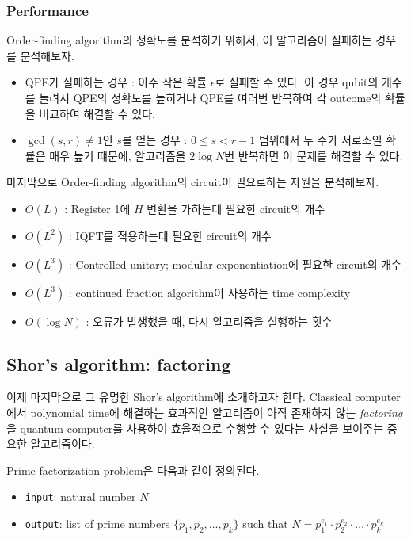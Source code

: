 \subsubsection{Performance}
Order-finding algorithm의 정확도를 분석하기 위해서, 이 알고리즘이 실패하는 경우를 분석해보자.
\begin{itemize}
  \item QPE가 실패하는 경우 : 아주 작은 확률 $\epsilon$로 실패할 수 있다. 이 경우 qubit의 개수를 늘려서 QPE의 정확도를 높히거나 QPE를 여러번 반복하여 각 outcome의 확률을 비교하여 해결할 수 있다.
  \item $\gcd(s,r) \ne 1$인 $s$를 얻는 경우 : $0 \le s <r-1$ 범위에서 두 수가 서로소일 확률은 매우 높기 떄문에, 알고리즘을 $2 \log N$번 반복하면 이 문제를 해결할 수 있다.
\end{itemize}
\vspace{1em}
마지막으로 Order-finding algorithm의 circuit이 필요로하는 자원을 분석해보자.
\begin{itemize}
  \item $O(L)$ : Register 1에 $H$ 변환을 가하는데 필요한 circuit의 개수
  \item $O(L^2)$ : IQFT를 적용하는데 필요한 circuit의 개수
  \item $O(L^3)$ : Controlled unitary; modular exponentiation에 필요한 circuit의 개수
  \item $O(L^3)$ : continued fraction algorithm이 사용하는 time complexity
  \item $O(\log N)$ : 오류가 발생했을 때, 다시 알고리즘을 실행하는 횟수
\end{itemize}


\subsection{Shor’s algorithm: factoring}
이제 마지막으로 그 유명한 Shor's algorithm에 소개하고자 한다. Classical computer에서 polynomial time에 해결하는 효과적인 알고리즘이 아직 존재하지 않는 \textit{factoring}을 quantum computer를 사용하여 효율적으로 수행할 수 있다는 사실을 보여주는 중요한 알고리즘이다.

\vspace{1em}

Prime factorization problem은 다음과 같이 정의된다.
\begin{itemize}
  \item \texttt{input}: natural number $N$
  \item \texttt{output}: list of prime numbers $\{p_1, p_2, \dots, p_k\}$ such that $N = p_1^{e_1} \cdot p_2^{e_2} \cdot \dots \cdot p_k^{e_k}$
\end{itemize}

